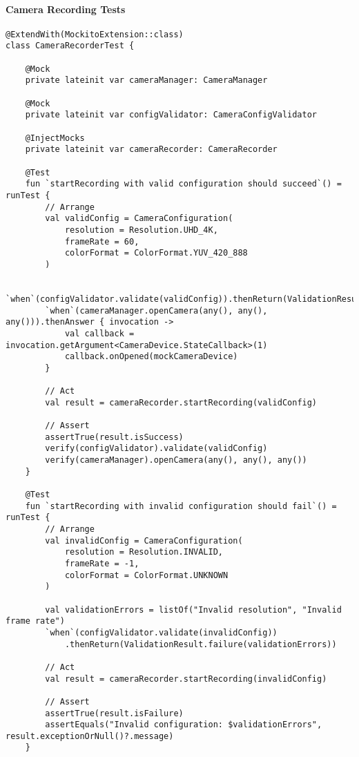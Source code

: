 \documentclass[12pt,a4paper]{report}
\begin{document}
\paragraph{Camera Recording Tests}

\begin{verbatim}
@ExtendWith(MockitoExtension::class)
class CameraRecorderTest {

    @Mock
    private lateinit var cameraManager: CameraManager

    @Mock
    private lateinit var configValidator: CameraConfigValidator

    @InjectMocks
    private lateinit var cameraRecorder: CameraRecorder

    @Test
    fun `startRecording with valid configuration should succeed`() = runTest {
        // Arrange
        val validConfig = CameraConfiguration(
            resolution = Resolution.UHD_4K,
            frameRate = 60,
            colorFormat = ColorFormat.YUV_420_888
        )

        `when`(configValidator.validate(validConfig)).thenReturn(ValidationResult.success())
        `when`(cameraManager.openCamera(any(), any(), any())).thenAnswer { invocation ->
            val callback = invocation.getArgument<CameraDevice.StateCallback>(1)
            callback.onOpened(mockCameraDevice)
        }

        // Act
        val result = cameraRecorder.startRecording(validConfig)

        // Assert
        assertTrue(result.isSuccess)
        verify(configValidator).validate(validConfig)
        verify(cameraManager).openCamera(any(), any(), any())
    }

    @Test
    fun `startRecording with invalid configuration should fail`() = runTest {
        // Arrange
        val invalidConfig = CameraConfiguration(
            resolution = Resolution.INVALID,
            frameRate = -1,
            colorFormat = ColorFormat.UNKNOWN
        )

        val validationErrors = listOf("Invalid resolution", "Invalid frame rate")
        `when`(configValidator.validate(invalidConfig))
            .thenReturn(ValidationResult.failure(validationErrors))

        // Act
        val result = cameraRecorder.startRecording(invalidConfig)

        // Assert
        assertTrue(result.isFailure)
        assertEquals("Invalid configuration: $validationErrors", result.exceptionOrNull()?.message)
    }


\end{verbatim}
\end{document}
